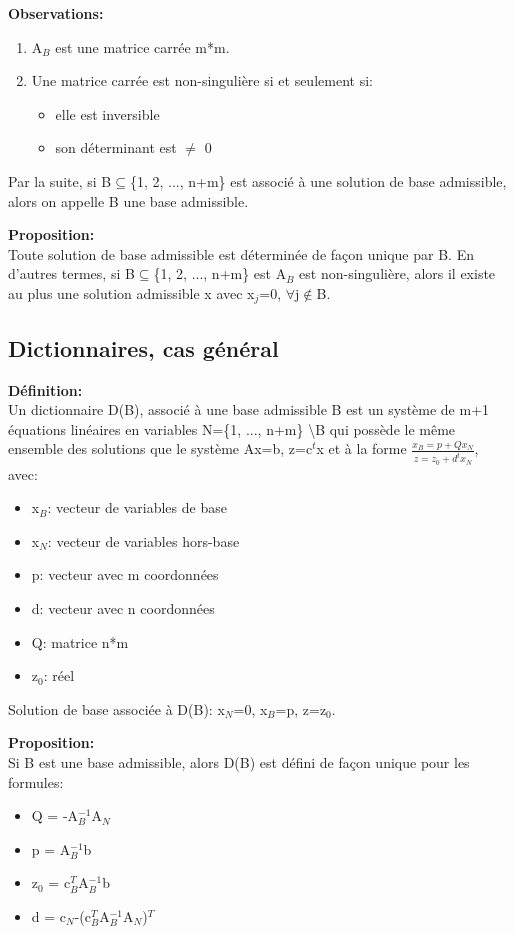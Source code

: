 \textbf{Observations:}
\begin{enumerate}
	\item A$_B$ est une matrice carrée m*m.
	\item Une matrice carrée est non-singulière si et seulement si:
	\begin{itemize}
		\item elle est inversible
		\item son déterminant est $\neq$ 0
	\end{itemize}
\end{enumerate}

Par la suite, si B$\subseteq$\{1, 2, ..., n+m\}  est associé à une solution de base admissible, alors on appelle B
une base admissible.

\textbf{Proposition:\\}
Toute solution de base admissible est déterminée de façon unique par B. En d'autres termes, si
B$\subseteq$\{1, 2, ..., n+m\} est A$_B$ est non-singulière, alors il existe au plus une solution admissible x avec
x$_j$=0, $\forall$j$\not\in$B.

\subsection{Dictionnaires, cas général}
\textbf{Définition:\\}
Un dictionnaire D(B), associé à une base admissible B est un système de m+1 équations linéaires en variables
N=\{1, ..., n+m\} \textbackslash B qui possède le même ensemble des solutions que le système Ax=b, z=c$^t$x et à la
forme $\frac{x_B=p+Qx_N}{z=z_0+d^tx_N}$, avec:
\begin{itemize}
	\item x$_B$: vecteur de variables de base
	\item x$_N$: vecteur de variables hors-base
	\item p: vecteur avec m coordonnées
	\item d: vecteur avec n coordonnées
	\item Q: matrice n*m
	\item z$_0$: réel
\end{itemize}
Solution de base associée à D(B): x$_N$=0, x$_B$=p, z=z$_0$.

\textbf{Proposition:\\}
Si B est une base admissible, alors D(B) est défini de façon unique pour les formules:
\begin{itemize}
	\item Q = -A$^{-1}_B$A$_N$
	\item p = A$^{-1}_B$b
	\item z$_0$ = c$^T_B$A$^{-1}_B$b
	\item d = c$_N$-(c$^T_B$A$^{-1}_B$A$_N$)$^T$
\end{itemize}

